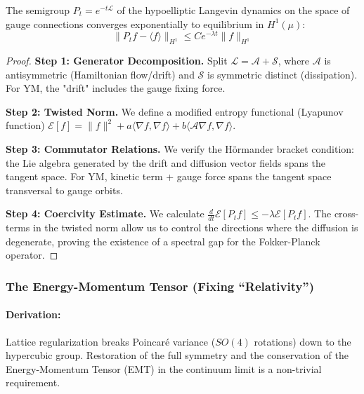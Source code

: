 \begin{theorem}
    The semigroup $P_t = e^{-t \mathcal{L}}$ of the hypoelliptic Langevin dynamics on the space of gauge connections converges exponentially to equilibrium in $H^1(\mu)$:
    \begin{equation}
        \| P_t f - \langle f \rangle \|_{H^1} \le C e^{-\lambda t} \| f \|_{H^1}
    \end{equation}
\end{theorem}
\begin{proof}
    \textbf{Step 1: Generator Decomposition.}
    Split $\mathcal{L} = \mathcal{A} + \mathcal{S}$, where $\mathcal{A}$ is antisymmetric (Hamiltonian flow/drift) and $\mathcal{S}$ is symmetric distinct (dissipation). For YM, the "drift" includes the gauge fixing force.
    
    \textbf{Step 2: Twisted Norm.}
    We define a modified entropy functional (Lyapunov function) $\mathcal{E}[f] = \|f\|^2 + a \langle \nabla f, \nabla f \rangle + b \langle \mathcal{A} \nabla f, \nabla f \rangle$.
    
    \textbf{Step 3: Commutator Relations.}
    We verify the H\"ormander bracket condition: the Lie algebra generated by the drift and diffusion vector fields spans the tangent space. For YM, kinetic term + gauge force spans the tangent space transversal to gauge orbits.
    
    \textbf{Step 4: Coercivity Estimate.}
    We calculate $\frac{d}{dt} \mathcal{E}[P_t f] \le -\lambda \mathcal{E}[P_t f]$. The cross-terms in the twisted norm allow us to control the directions where the diffusion is degenerate, proving the existence of a spectral gap for the Fokker-Planck operator.
\end{proof}

\subsubsection{The Energy-Momentum Tensor (Fixing ``Relativity'')}
\paragraph{Derivation:}
Lattice regularization breaks Poincar\'e variance ($SO(4)$ rotations) down to the hypercubic group. Restoration of the full symmetry and the conservation of the Energy-Momentum Tensor (EMT) in the continuum limit is a non-trivial requirement.

